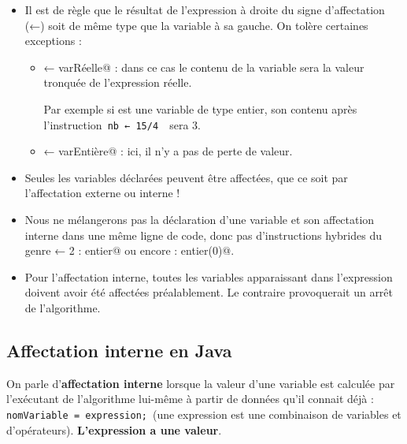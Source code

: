 \documentclass[11pt,a4paper]{article}
\begin{document}
					\begin{itemize}
				
			\item 
              Il est de r\`egle que le r\'esultat de l'expression \`a droite du signe d'affectation (←) soit de
              m\^eme type que la variable \`a sa gauche. On tol\`ere certaines exceptions :
              
					\begin{itemize}
				
			\item {} ← varRéelle@ : dans ce cas le contenu de la variable sera la valeur tronqu\'ee de l'expression r\'eelle. \par
				
                  Par exemple si \verb@nb@ est une variable de type entier,
                  son contenu apr\`es l'instruction \,\verb|nb ← 15/4 |\, sera 3.
                
			\item {} ← varEntière@ : ici, il n'y a pas de perte de valeur.
					\end{itemize}
				
			\item 
            Seules les variables d\'eclar\'ees peuvent \^etre affect\'ees, que ce soit par l'affectation externe
            ou interne !
            
			\item 
            Nous ne m\'elangerons pas la d\'eclaration d'une variable et son affectation interne dans
            une m\^eme ligne de code, donc pas d'instructions hybrides du genre \verb@x ← 2 : entier@ ou
            encore \verb@x : entier(0)@.
            
			\item 
            Pour l'affectation interne, toutes les variables apparaissant dans l'expression doivent
            avoir \'et\'e affect\'ees pr\'ealablement. Le contraire provoquerait un arr\^et de l'algorithme.
            
					\end{itemize}
				
            \par
        \subsection{Affectation interne en Java}
          On parle d'\textbf{affectation interne} lorsque la valeur d'une variable est \guillemotleft  calcul\'ee \guillemotright  par l'ex\'ecutant
          de l'algorithme lui-m\^eme \`a partir de donn\'ees qu'il connait d\'ej\`a :
          \,\verb|nomVariable = expression;|\,
          (une expression est une combinaison de variables et d'op\'erateurs). \textbf{L'expression a une valeur}.
        
\end{document}
